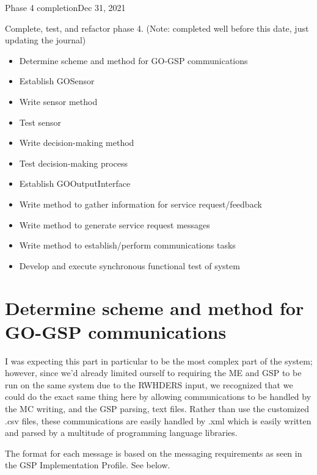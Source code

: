 \begin{entry}{Phase 4 completion}{Dec 31, 2021}
    \objective 
    
    Complete, test, and refactor phase 4. (Note: completed well before this date, just updating the journal)


    \outline

    \begin{itemize}
        \item Determine scheme and method for GO-GSP communications
        \item Establish GOSensor
        \item Write sensor method
        \item Test sensor
        \item Write decision-making method
        \item Test decision-making process
        \item Establish GOOutputInterface
        \item Write method to gather information for service request/feedback
        \item Write method to generate service request messages
        \item Write method to establish/perform communications tasks
        \item Develop and execute synchronous functional test of system
    \end{itemize}

    \procedures

    \section*{Determine scheme and method for GO-GSP communications}
    I was expecting this part in particular to be the most complex part of the system; however, since we'd already
    limited ourself to requiring the ME and GSP to be run on the same system due to the RWHDERS input, we recognized
    that we could do the exact same thing here by allowing communications to be handled by the MC writing, and the GSP
    parsing, text files. Rather than use the customized .csv files, these communications are easily handled by .xml
    which is easily written and parsed by a multitude of programming language libraries.

    The format for each message is based on the messaging requirements as seen in the GSP Implementation Profile. See
    below.


\end{entry}

